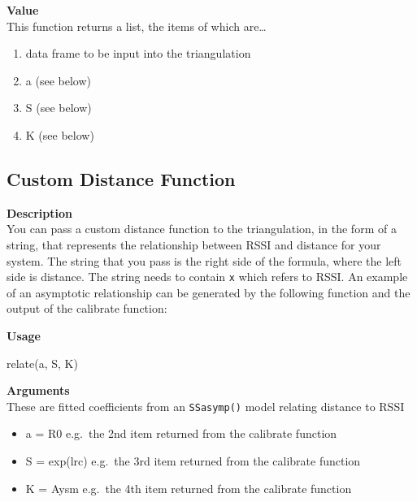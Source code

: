 \documentclass[
]{book}
\newenvironment{Shaded}{\begin{snugshade}}{\end{snugshade}}
\newcommand{\FunctionTok}[1]{\textcolor[rgb]{0.00,0.00,0.00}{#1}}
\newcommand{\NormalTok}[1]{#1}
\providecommand{\tightlist}{%
  \setlength{\itemsep}{0pt}\setlength{\parskip}{0pt}}
\begin{document}
\textbf{Value}\\
This function returns a list, the items of which are\ldots{}

\begin{enumerate}
\def\labelenumi{\arabic{enumi}.}
\tightlist
\item
  data frame to be input into the triangulation\\
\item
  a (see below)\\
\item
  S (see below)\\
\item
  K (see below)
\end{enumerate}

\hypertarget{custom-distance-function}{%
\subsection{Custom Distance Function}\label{custom-distance-function}}

\textbf{Description}\\
You can pass a custom distance function to the triangulation, in the form of a string, that represents the relationship between RSSI and distance for your system. The string that you pass is the right side of the formula, where the left side is distance. The string needs to contain \texttt{x} which refers to RSSI. An example of an asymptotic relationship can be generated by the following function and the output of the calibrate function:

\textbf{Usage}

\begin{Shaded}
\begin{Highlighting}[]
\FunctionTok{relate}\NormalTok{(a, S, K)}
\end{Highlighting}
\end{Shaded}

\textbf{Arguments}\\
These are fitted coefficients from an \texttt{SSasymp()} model relating distance to RSSI

\begin{itemize}
\tightlist
\item
  a = R0 e.g.~the 2nd item returned from the calibrate function\\
\item
  S = exp(lrc) e.g.~the 3rd item returned from the calibrate function\\
\item
  K = Aysm e.g.~the 4th item returned from the calibrate function
\end{itemize}
\end{document}
